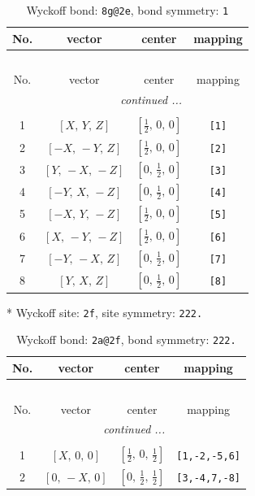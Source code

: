 \documentclass[fleqn,8pt]{jsarticle}
\begin{document}
\begin{longtable}{cccc}
\caption{Wyckoff bond: {\tt 8g@2e}, bond symmetry: {\tt 1}}
 \\
 \hline \hline
No. & vector & center & mapping \\ \hline \endfirsthead

\multicolumn{3}{l}{\tablename\ \thetable{}} \\
 \hline \hline
No. & vector & center & mapping \\ \hline \endhead

 \hline \hline
\multicolumn{3}{r}{\footnotesize\it continued ...} \\ \endfoot

 \hline \hline
\multicolumn{3}{r}{} \\ \endlastfoot

1 & $\left[ X,\, Y,\, Z \right]$ & $\left[ \frac{1}{2},\, 0,\, 0 \right]$ & {\tt [1]} \\ \hline
2 & $\left[ - X,\, - Y,\, Z \right]$ & $\left[ \frac{1}{2},\, 0,\, 0 \right]$ & {\tt [2]} \\ \hline
3 & $\left[ Y,\, - X,\, - Z \right]$ & $\left[ 0,\, \frac{1}{2},\, 0 \right]$ & {\tt [3]} \\ \hline
4 & $\left[ - Y,\, X,\, - Z \right]$ & $\left[ 0,\, \frac{1}{2},\, 0 \right]$ & {\tt [4]} \\ \hline
5 & $\left[ - X,\, Y,\, - Z \right]$ & $\left[ \frac{1}{2},\, 0,\, 0 \right]$ & {\tt [5]} \\ \hline
6 & $\left[ X,\, - Y,\, - Z \right]$ & $\left[ \frac{1}{2},\, 0,\, 0 \right]$ & {\tt [6]} \\ \hline
7 & $\left[ - Y,\, - X,\, Z \right]$ & $\left[ 0,\, \frac{1}{2},\, 0 \right]$ & {\tt [7]} \\ \hline
8 & $\left[ Y,\, X,\, Z \right]$ & $\left[ 0,\, \frac{1}{2},\, 0 \right]$ & {\tt [8]} \\
\end{longtable}
* Wyckoff site: {\tt 2f}, site symmetry: {\tt 222.}
\renewcommand{\arraystretch}{1.2}
\begin{longtable}{cccc}
\caption{Wyckoff bond: {\tt 2a@2f}, bond symmetry: {\tt 222.}}
 \\
 \hline \hline
No. & vector & center & mapping \\ \hline \endfirsthead

\multicolumn{3}{l}{\tablename\ \thetable{}} \\
 \hline \hline
No. & vector & center & mapping \\ \hline \endhead

 \hline \hline
\multicolumn{3}{r}{\footnotesize\it continued ...} \\ \endfoot

 \hline \hline
\multicolumn{3}{r}{} \\ \endlastfoot

1 & $\left[ X,\, 0,\, 0 \right]$ & $\left[ \frac{1}{2},\, 0,\, \frac{1}{2} \right]$ & {\tt [1,-2,-5,6]} \\ \hline
2 & $\left[ 0,\, - X,\, 0 \right]$ & $\left[ 0,\, \frac{1}{2},\, \frac{1}{2} \right]$ & {\tt [3,-4,7,-8]} \\
\end{longtable}
\end{document}
